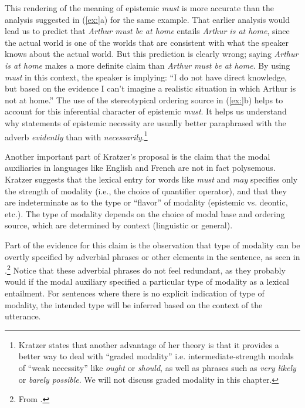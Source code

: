 This rendering of the meaning of epistemic \textit{must} is more accurate than the analysis suggested in (\ref{ex:}a) for the same example. That earlier analysis would lead us to predict that \textit{Arthur must be at home} entails \textit{Arthur is at home}, since the actual world is one of the worlds that are consistent with what the speaker knows about the actual world. But this prediction is clearly wrong; saying \textit{Arthur is at home} makes a more definite claim than \textit{Arthur must be at home}. By using \textit{must} in this context, the speaker is implying: “I do not have direct knowledge, but based on the evidence I can’t imagine a realistic situation in which Arthur is not at home.” The use of the stereotypical ordering source in (\ref{ex:}b) helps to account for this inferential character of epistemic \textit{must}. It helps us understand why statements of epistemic necessity are usually better paraphrased with the adverb \textit{evidently} than with \textit{necessarily}.\footnote{Kratzer states that another advantage of her theory is that it provides a better way to deal with “graded modality” i.e. intermediate-strength modals of “weak necessity” like \textit{ought} or \textit{should}, as well as phrases such as \textit{very likely} or \textit{barely possible}. We will not discuss graded modality in this chapter.}



Another important part of Kratzer’s proposal is the claim that the modal auxiliaries in languages like English and French are not in fact polysemous. Kratzer suggests that the lexical entry for words like \textit{must} and \textit{may} specifies only the strength of modality (i.e., the choice of quantifier operator), and that they are indeterminate as to the type or “flavor” of modality (epistemic vs. deontic, etc.). The type of modality depends on the choice of modal base and ordering source, which are determined by context (linguistic or general).



Part of the evidence for this claim is the observation that type of modality can be overtly specified by adverbial phrases or other elements in the sentence, as seen in .\footnote{From \citet{Hacquard2011}.} Notice that these adverbial phrases do not feel redundant, as they probably would if the modal auxiliary specified a particular type of modality as a lexical entailment. For sentences where there is no explicit indication of type of modality, the intended type will be inferred based on the context of the utterance.


